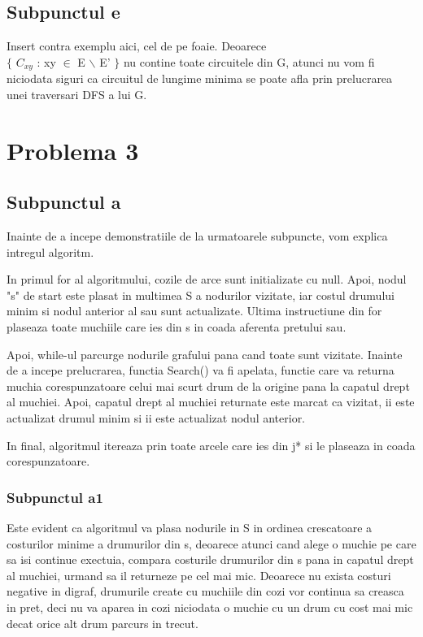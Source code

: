 \documentclass{article}
\begin{document}
\subsection*{\fontsize{16}{30}\selectfont Subpunctul e}
{\fontsize{14}{16}\selectfont
Insert contra exemplu aici, cel de pe foaie. 
Deoarece \\ $\lbrace$ $C_{xy}$ : xy $\in$ E $\backslash$ E' $\rbrace$ nu contine toate circuitele din G, atunci nu vom fi niciodata siguri ca circuitul de lungime minima se poate afla prin prelucrarea unei traversari DFS a lui G.  
}

\section*{\fontsize{20}{50}\selectfont Problema 3}
\subsection*{\fontsize{16}{30}\selectfont Subpunctul a}
{\fontsize{14}{16}\selectfont
Inainte de a incepe demonstratiile de la urmatoarele subpuncte, vom explica intregul algoritm.

In primul for al algoritmului, cozile de arce sunt initializate cu null.
Apoi, nodul "s" de start este plasat in multimea S a nodurilor vizitate, iar costul drumului minim si nodul anterior al sau sunt actualizate. Ultima instructiune din for plaseaza toate muchiile care ies din s in coada aferenta pretului sau.

Apoi, while-ul parcurge nodurile grafului pana cand toate sunt vizitate. Inainte de a incepe prelucrarea, functia Search() va fi apelata, functie care va returna muchia corespunzatoare celui mai scurt drum de la origine pana la capatul drept al muchiei. Apoi, capatul drept al muchiei returnate este marcat ca vizitat, ii este actualizat drumul minim si ii este actualizat nodul anterior. 

In final, algoritmul itereaza prin toate arcele care ies din j* si le plaseaza in coada corespunzatoare.
}
\subsubsection*{\fontsize{14}{20}\selectfont Subpunctul a1}
{\fontsize{14}{16}\selectfont
Este evident ca algoritmul va plasa nodurile in S in ordinea crescatoare a costurilor minime a drumurilor din s, deoarece atunci cand alege o muchie pe care sa isi continue exectuia, compara costurile drumurilor din s pana in capatul drept al muchiei, urmand sa il returneze pe cel mai mic. Deoarece nu exista costuri negative in digraf, drumurile create cu muchiile din cozi vor continua sa creasca in pret, deci nu va aparea in cozi niciodata o muchie cu un drum cu cost mai mic decat orice alt drum parcurs in trecut.
}
\end{document}
